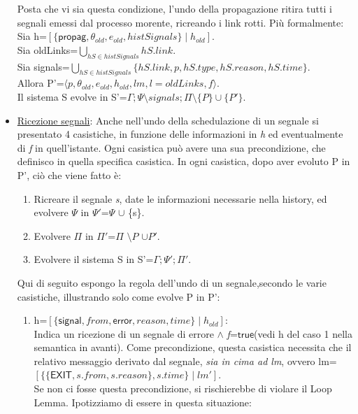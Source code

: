 \documentclass[Contributo.tex]{subfiles}
\begin{document}
\begin{itemize}
		Posta che vi sia questa condizione, l'undo della propagazione ritira tutti i segnali emessi dal processo morente, ricreando i link rotti.
		Più formalmente:\\
		Sia h=$\displaystyle [\{\mathsf{propag},\theta_{old},e_{old},histSignals\} \mid h_{old}]$.\\
		Sia oldLinks=$\displaystyle  \bigcup_{hS \in histSignals}hS.link $.\\ 
		Sia signals=$\displaystyle \bigcup_{hS \in histSignals}\{hS.link,p,hS.type,hS.reason,hS.time\}$.\\
		Allora P'=$\displaystyle \langle p,\theta_{old},e_{old},h_{old},lm,l=oldLinks,f \rangle$.\\
		Il sistema S evolve in S'=$\displaystyle \Gamma;\Psi \setminus signals;\Pi \setminus \{P\} \cup \{P'\} $.
		\item \underline{Ricezione segnali}: Anche nell'undo della schedulazione di un segnale si presentato 4 casistiche, in funzione delle informazioni in \textit{h} ed eventualmente di \textit{f} in quell'istante.
		Ogni casistica può avere una sua precondizione, che definisco in quella specifica casistica.
		In ogni casistica, dopo aver evoluto P in P', ciò che viene fatto è:
		\begin{enumerate}
			\item Ricreare il segnale \textit{s}, date le informazioni necessarie nella history, ed evolvere $\Psi$ in $\Psi'$=$\Psi$ $\cup$ \{s\}.
			\item Evolvere $\Pi$ in $\Pi'$=$\Pi$ $\setminus{P}$ $\cup{P'}$.
			\item Evolvere il sistema S in S'=$\displaystyle \Gamma;\Psi';\Pi'$.
		\end{enumerate}
		Qui di seguito espongo la regola dell'undo di un segnale,secondo le varie casistiche, illustrando solo come evolve P in P':
		\begin{enumerate}
		\item h=$\displaystyle [\{\mathsf{signal},from,\mathsf{error},reason,time\} \mid h_{old}]$:\\
			  Indica un ricezione di un  segnale di errore $\wedge$ \textit{f}=$\mathsf{true}$(vedi h del caso 1 nella semantica in avanti).
			  Come precondizione, questa casistica necessita che il relativo messaggio derivato dal segnale, \textit{sia in cima ad lm}, ovvero lm=$\displaystyle [\{\{\mathsf{EXIT},s.from,s.reason\},s.time\} \mid lm']$.\\
			  Se non ci fosse questa precondizione, si rischierebbe di violare il Loop Lemma. Ipotizziamo di essere in questa situazione:\\

\end{enumerate}
\end{itemize}
\end{document}
